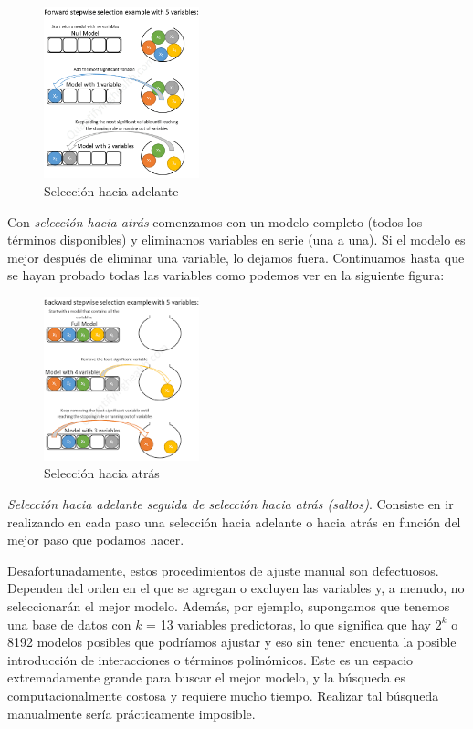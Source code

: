 \documentclass[
]{book}
\begin{document}
\begin{figure}
\centering
\includegraphics[width=0.4\textwidth,height=\textheight]{figures/fwd_stepwise.png}
\caption{Selección hacia adelante}
\end{figure}

Con \emph{selección hacia atrás} comenzamos con un modelo completo (todos los términos disponibles) y eliminamos variables en serie (una a una). Si el modelo es mejor después de eliminar una variable, lo dejamos fuera. Continuamos hasta que se hayan probado todas las variables como podemos ver en la siguiente figura:

\begin{figure}
\centering
\includegraphics[width=0.4\textwidth,height=\textheight]{figures/bwd_stepwise.png}
\caption{Selección hacia atrás}
\end{figure}

\emph{Selección hacia adelante seguida de selección hacia atrás (saltos)}. Consiste en ir realizando en cada paso una selección hacia adelante o hacia atrás en función del mejor paso que podamos hacer.

Desafortunadamente, estos procedimientos de ajuste manual son defectuosos. Dependen del orden en el que se agregan o excluyen las variables y, a menudo, no seleccionarán el mejor modelo. Además, por ejemplo, supongamos que tenemos una base de datos con \(k\) = 13 variables predictoras, lo que significa que hay \(2^k\) o 8192 modelos posibles que podríamos ajustar y eso sin tener encuenta la posible introducción de interacciones o términos polinómicos. Este es un espacio extremadamente grande para buscar el mejor modelo, y la búsqueda es computacionalmente costosa y requiere mucho tiempo. Realizar tal búsqueda manualmente sería prácticamente imposible.
\end{document}
